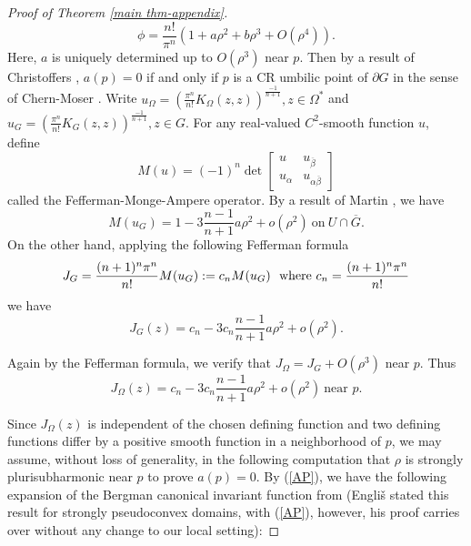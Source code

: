 \documentclass[a4paper,centertags,oneside,12pt]{amsart}
\numberwithin{equation}{section}
\begin{document}
\begin{proof}[Proof of Theorem \ref{main thm-appendix}]
\begin{equation*}
    \phi=\frac{n!}{\pi^n}(1+a\rho^2+b\rho^3+O(\rho^4)).
\end{equation*}
Here, $a$ is uniquely determined up to $O(\rho^3)$ near $p$. Then by a result of Christoffers \cite{Ch81}, $a(p)=0$ if and only if $p$ is a CR umbilic point of $\partial G$ in the sense of Chern-Moser \cite{CM74}. Write $u_{\Omega}=(\frac{\pi^n}{n!}K_{\Omega}(z, z))^{\frac{-1}{n+1}}, z\in\Omega^\ast$ and $u_G=(\frac{\pi^n}{n!}K_{G}(z, z))^{\frac{-1}{n+1}}, z\in G$. For any real-valued  $C^2$-smooth function $u$, define
\begin{equation}\label{MA}
{M}(u)=(-1)^n\det\left[\begin{array}{cc}
     u & u_{\overline\beta}  \\
     u_{\alpha}&  u_{\alpha\overline\beta}
\end{array}\right]
\end{equation}
called  the Fefferman-Monge-Ampere operator. By a result of Martin \cite[Page 93]{Ma21}, 
we have
$$M(u_{G})=1-3\frac{n-1}{n+1}a\rho^2+o(\rho^2)~\text{on} ~U\cap \overline G.$$
On the other hand, applying the following Fefferman formula \cite{Ma21} 
\begin{equation}\label{Fefferman formula}
    J_{G}=\frac{(n+1)^n\pi^n}{n!} M(u_{G}):=c_n M(u_{G}) \ \ \hbox{where  } c_n=\frac{(n+1)^n\pi^n}{n!}
\end{equation}
 we have
\begin{equation}
    J_G(z)=c_n-3c_n\frac{n-1}{n+1}a\rho^2+o(\rho^2).
\end{equation}
 
Again by the Fefferman formula, we verify that 
$J_\Omega=J_G+O(\rho^3)$ near $p$. Thus 
\begin{equation}
    J_{\Omega}(z)=c_n-3c_n\frac{n-1}{n+1}a\rho^2+o(\rho^2)~\text{near }p.
\end{equation}

Since $J_\Omega(z)$  is independent of the chosen defining function and two defining functions differ by a positive smooth function in a neighborhood of $p$, we may assume, without loss of generality,  in the following computation that $\rho$ is strongly plurisubharmonic near $p$ to prove $a(p) = 0$.
By (\ref{AP}), we have the following expansion of the Bergman canonical invariant function from \cite{Eng08} (Engliš stated this result for strongly pseudoconvex domains, with (\ref{AP}),  however, his proof carries over without any change to our local setting):


\end{proof}
\end{document}
